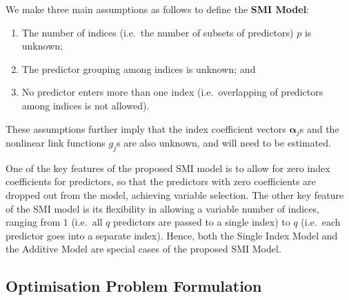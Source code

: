 \documentclass[11pt,a4paper,]{article}
\begin{document}
We make three main assumptions as follows to define the \textbf{SMI
Model}:

\begin{enumerate}
\def\labelenumi{\arabic{enumi}.}
\item
  The number of indices (i.e.~the number of subsets of predictors) \(p\)
  is unknown;
\item
  The predictor grouping among indices is unknown; and
\item
  No predictor enters more than one index (i.e.~overlapping of
  predictors among indices is not allowed).
\end{enumerate}

These assumptions further imply that the index coefficient vectors
\(\bm{\alpha}_{j}\)s and the nonlinear link functions \(g_{j}\)s are
also unknown, and will need to be estimated.

One of the key features of the proposed SMI model is to allow for zero
index coefficients for predictors, so that the predictors with zero
coefficients are dropped out from the model, achieving variable
selection. The other key feature of the SMI model is its flexibility in
allowing a variable number of indices, ranging from \(1\) (i.e.~all
\(q\) predictors are passed to a single index) to \(q\) (i.e.~each
predictor goes into a separate index). Hence, both the Single Index
Model and the Additive Model are special cases of the proposed SMI
Model.

\hypertarget{optimisation-problem-formulation}{%
\subsection{Optimisation Problem
Formulation}\label{optimisation-problem-formulation}}
\end{document}

